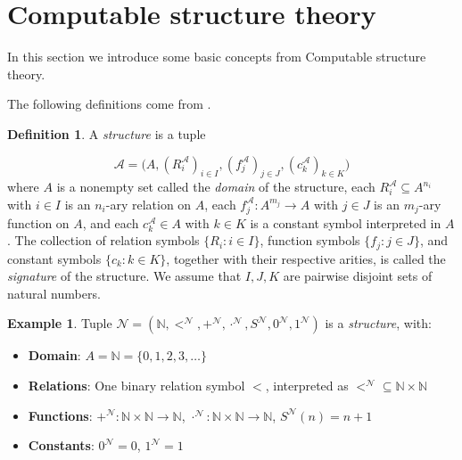 \documentclass{pracalicmgr2025}
\theoremstyle{plain}            %
\theoremstyle{remark}           %
\theoremstyle{definition}       %
\newtheorem{example}[theorem]{Example}
\newtheorem{definition}[theorem]{Definition}
\begin{document}
\section{Computable structure theory} \label{Computable structure theory}
In this section we introduce some basic concepts from Computable structure theory.

The following definitions come from \cite{6}.



\begin{definition} \label{structure}
A \emph{structure} is a tuple

$$\mathcal{A} = \bigl(A, (R_i^{\mathcal{A}})_{i \in I}, (f_j^{\mathcal{A}})_{j \in J}, (c_k^{\mathcal{A}})_{k \in K}\bigr)$$
where $A$ is a nonempty set called the \emph{domain} of the structure, each $R_i^{\mathcal{A}} \subseteq A^{n_i}$ with $i \in I$ is an $n_i$-ary relation on $A$, each $f_j^{\mathcal{A}} : A^{m_j} \to A$ with $j \in J$ is an $m_j$-ary function on $A$, and each $c_k^{\mathcal{A}} \in A$ with $k \in K$ is a constant symbol interpreted in $A$. The collection of relation symbols $\{R_i : i \in I\}$, function symbols $\{f_j : j \in J\}$, and constant symbols $\{c_k : k \in K\}$, together with their respective arities, is called the \emph{signature} of the structure. We assume that $I,J,K$ are pairwise disjoint sets of natural numbers. 
\end{definition}

\begin{example} \label{example of a strcture}
  Tuple $\mathcal{N} = (\mathbb{N}, <^{\mathcal{N}}, +^{\mathcal{N}}, \cdot^{\mathcal{N}}, S^{\mathcal{N}}, 0^{\mathcal{N}}, 1^{\mathcal{N}})$ is a \textit{structure}, with:
\begin{itemize}
    \item \textbf{Domain}: 
        $A = \mathbb{N} = \{0,1,2,3,\dots\}$

    \item \textbf{Relations}: One binary relation symbol 
        $<$, interpreted as $<^{\mathcal{N}} \subseteq \mathbb{N} \times \mathbb{N}$

    \item \textbf{Functions}:
          $+^{\mathcal{N}} : \mathbb{N} \times \mathbb{N} \to \mathbb{N}$,  
          $\cdot^{\mathcal{N}} : \mathbb{N} \times \mathbb{N} \to \mathbb{N}$,  
          $S^{\mathcal{N}}(n) = n+1$
        
    \item\textbf{Constants}:
          $0^{\mathcal{N}} = 0$, $1^{\mathcal{N}} = 1$
\end{itemize}
\end{example} 
\end{document}
